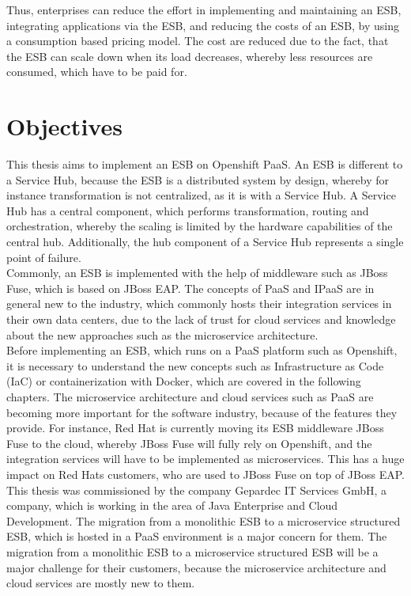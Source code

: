 Thus, enterprises can reduce the effort in implementing and maintaining an ESB, integrating applications via the ESB, and reducing the costs of an ESB, by using a consumption based pricing model. The cost are reduced due to the fact, that the ESB can scale down when its load decreases, whereby less resources are consumed, which have to be paid for.

\section{Objectives}
\label{sec:intro-objectives}
This thesis aims to implement an ESB on Openshift PaaS. An ESB is different to a Service Hub, because the ESB is a distributed system by design, whereby for instance transformation is not centralized, as it is with a Service Hub. A Service Hub has a central component, which performs transformation, routing and orchestration, whereby the scaling is limited by the hardware capabilities of the central hub. Additionally, the hub component of a Service Hub represents a single point of failure\cite{EIP}. \\

Commonly, an ESB is implemented with the help of middleware such as JBoss Fuse, which is based on JBoss EAP. The concepts of PaaS and IPaaS are in general new to the industry, which commonly hosts their integration services in their own data centers, due to the lack of trust for cloud services and knowledge about the new approaches such as the microservice architecture\cite{Openshift2018}. \\

Before implementing an ESB, which runs on a PaaS platform such as Openshift, it is necessary to understand the new concepts such as Infrastructure as Code (IaC) or containerization with Docker, which are covered in the following chapters. The microservice architecture and cloud services such as PaaS are becoming more important for the software industry, because of the features they provide. For instance, Red Hat is currently moving its ESB middleware JBoss Fuse to the cloud, whereby JBoss Fuse will fully rely on Openshift, and the integration services will have to be implemented as microservices. This has a huge impact on Red Hats customers, who are used to JBoss Fuse on top of JBoss EAP. \\

This thesis was commissioned by the company Gepardec IT Services GmbH, a company, which is working in the area of Java Enterprise and Cloud Development. The migration from a monolithic ESB to a microservice structured ESB, which is hosted in a PaaS environment is a major concern for them. The migration from a monolithic ESB to a microservice structured ESB will be a major challenge for their customers, because the microservice architecture and cloud services are mostly new to them.  \\

